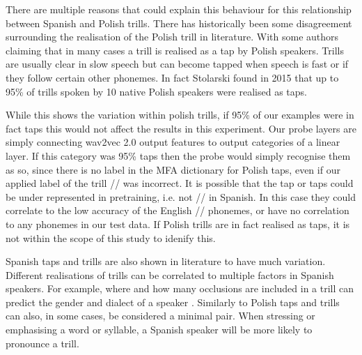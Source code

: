 There are multiple reasons that could explain this behaviour for this relationship between Spanish and Polish trills. There has historically been some disagreement surrounding the realisation of the Polish trill in literature. With some authors claiming that in many cases a trill is realised as a tap by Polish speakers. Trills are usually clear in slow speech but can become tapped when speech is fast or if they follow certain other phonemes. In fact Stolarski found in 2015 that up to 95\% of trills spoken by 10 native Polish speakers were realised as taps. 

While this shows the variation within polish trills, if 95\% of our examples were in fact taps this would not affect the results in this experiment. Our probe layers are simply connecting wav2vec 2.0 output features to output categories of a linear layer. If this category was 95\% taps then the probe would simply recognise them as so, since there is no label in the MFA dictionary for Polish taps, even if our applied label of the trill // was incorrect. It is possible that the tap or taps could be under represented in pretraining, i.e. not // in Spanish. In this case they could correlate to the low accuracy of the English // phonemes, or have no correlation to any phonemes in our test data. If Polish trills are in fact realised as taps, it is not within the scope of this study to idenify this.  

Spanish taps and trills are also shown in literature to have much variation. Different realisations of trills can be correlated to multiple factors in Spanish speakers. For example, where and how many occlusions are included in a trill can predict the gender and dialect of a speaker \cite{henriksen2023sociophonetic}. Similarly to Polish taps and trills can also, in some cases, be considered a minimal pair. When stressing or emphasising a word or syllable, a Spanish speaker will be more likely to pronounce a trill. 

